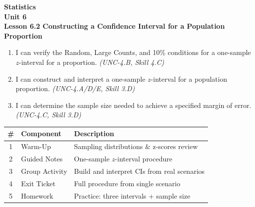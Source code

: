 \documentclass[10pt]{article}
\begin{document}
\vspace{-0.8in}

\begin{center}
  {\color{white}\textbf{\LARGE Statistics}}\\[4pt]
  {\color{skymid}\large\textbf{Unit 6}}\\[6pt]
  {\color{white}\textbf{\large Lesson 6.2 \quad Constructing a Confidence Interval for a Population Proportion}}
\end{center}

\vspace{0.22in}
\namedateperiod
\vspace{0.18in}

\begin{learningtargetbox}
\small
\begin{enumerate}[leftmargin=1.5em, itemsep=5pt]
  \item I can verify the Random, Large Counts, and 10\% conditions for a one-sample $z$-interval for a proportion. \textit{(UNC-4.B, Skill 4.C)}
  \item I can construct and interpret a one-sample $z$-interval for a population proportion. \textit{(UNC-4.A/D/E, Skill 3.D)}
  \item I can determine the sample size needed to achieve a specified margin of error. \textit{(UNC-4.C, Skill 3.D)}
\end{enumerate}
\end{learningtargetbox}

\vspace{0.14in}

\begin{tocbox}
\small
\renewcommand{\arraystretch}{1.5}
\begin{tabularx}{\linewidth}{@{} c l X @{}}
\rowcolor{sky}
\textbf{\#} & \textbf{Component} & \textbf{Description} \\
\midrule
1 & Warm-Up        & Sampling distributions \& z-scores review \\
2 & Guided Notes   & One-sample $z$-interval procedure \\
3 & Group Activity & Build and interpret CIs from real scenarios \\
4 & Exit Ticket    & Full procedure from single scenario \\
5 & Homework       & Practice: three intervals + sample size \\
\end{tabularx}
\end{tocbox}
\end{document}
